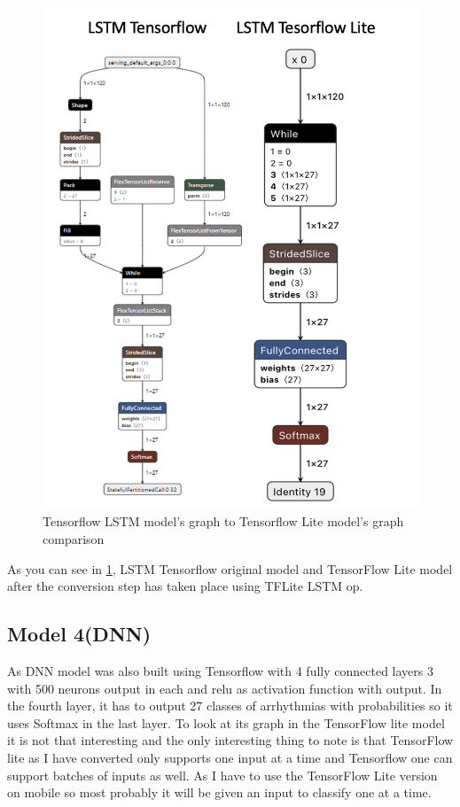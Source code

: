 \begin{figure}[H]
\centering
\includegraphics[scale=0.7]{img/lstm_conversion_comparison.png}
\caption{Tensorflow LSTM model's graph to Tensorflow Lite model's graph comparison}
\label{fig:lstm_conversion_comparison}
\end{figure}


As you can see in \ref{fig:lstm_conversion_comparison}, LSTM Tensorflow original model and TensorFlow Lite model after the conversion step has taken place using TFLite LSTM op. 

\subsection{Model 4(DNN)}\label{5CTLM4}

As DNN model was also built using Tensorflow with 4 fully connected layers 3 with 500 neurons output in each and relu as activation function with output. In the fourth layer, it has to output 27 classes of arrhythmias with probabilities so it uses Softmax in the last layer. To look at its graph in the TensorFlow lite model it is not that interesting and the only interesting thing to note is that TensorFlow lite as I have converted only supports one input at a time and Tensorflow one can support batches of inputs as well. As I have to use the TensorFlow Lite version on mobile so most probably it will be given an input to classify one at a time. 


